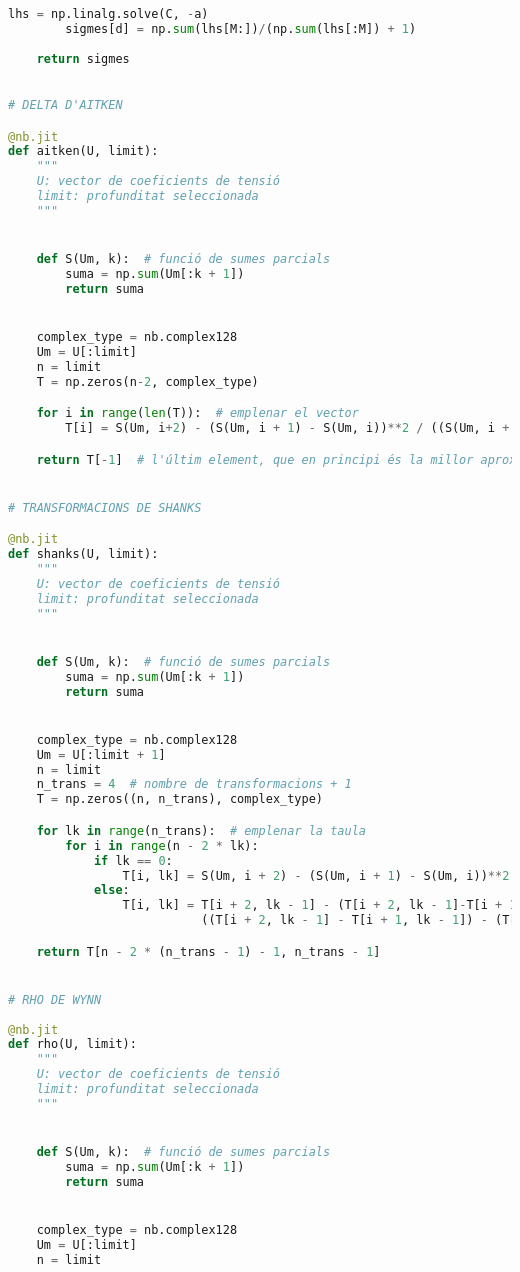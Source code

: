 \begin{lstlisting}[language=Python,numbers=none]
        lhs = np.linalg.solve(C, -a)
        sigmes[d] = np.sum(lhs[M:])/(np.sum(lhs[:M]) + 1)
        
    return sigmes
    

# DELTA D'AITKEN    

@nb.jit
def aitken(U, limit):
    """
    U: vector de coeficients de tensió
    limit: profunditat seleccionada
    """


    def S(Um, k):  # funció de sumes parcials
        suma = np.sum(Um[:k + 1])
        return suma


    complex_type = nb.complex128
    Um = U[:limit]
    n = limit
    T = np.zeros(n-2, complex_type)

    for i in range(len(T)):  # emplenar el vector
        T[i] = S(Um, i+2) - (S(Um, i + 1) - S(Um, i))**2 / ((S(Um, i + 2) - S(Um, i + 1)) - (S(Um, i + 1) - S(Um, i)))

    return T[-1]  # l'últim element, que en principi és la millor aproximació


# TRANSFORMACIONS DE SHANKS

@nb.jit
def shanks(U, limit):
    """
    U: vector de coeficients de tensió
    limit: profunditat seleccionada
    """


    def S(Um, k):  # funció de sumes parcials
        suma = np.sum(Um[:k + 1])
        return suma


    complex_type = nb.complex128
    Um = U[:limit + 1]
    n = limit
    n_trans = 4  # nombre de transformacions + 1
    T = np.zeros((n, n_trans), complex_type)

    for lk in range(n_trans):  # emplenar la taula
        for i in range(n - 2 * lk):
            if lk == 0:
                T[i, lk] = S(Um, i + 2) - (S(Um, i + 1) - S(Um, i))**2 / ((S(Um, i + 2) - S(Um, i + 1)) - (S(Um, i + 1) - S(Um, i)))
            else:
                T[i, lk] = T[i + 2, lk - 1] - (T[i + 2, lk - 1]-T[i + 1, lk - 1])**2 / \
                           ((T[i + 2, lk - 1] - T[i + 1, lk - 1]) - (T[i + 1, lk - 1] - T[i, lk - 1]))

    return T[n - 2 * (n_trans - 1) - 1, n_trans - 1]


# RHO DE WYNN        
        
@nb.jit
def rho(U, limit):
    """
    U: vector de coeficients de tensió
    limit: profunditat seleccionada
    """


    def S(Um, k):  # funció de sumes parcials
        suma = np.sum(Um[:k + 1])
        return suma


    complex_type = nb.complex128
    Um = U[:limit]
    n = limit


\end{lstlisting}
